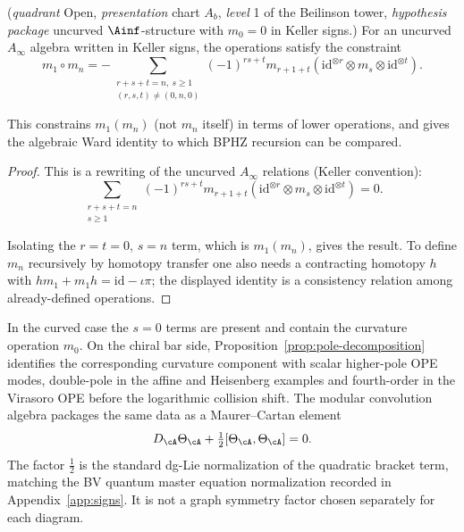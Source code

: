 \begin{theorem}
\label{thm:ainfty-constraint-formula}
\textup{(}\emph{quadrant} Open, \emph{presentation} chart $A_b$,
\emph{level} 1 of the Beilinson tower, \emph{hypothesis package}
uncurved $\Ainf$-structure with $m_0 = 0$ in Keller signs.\textup{)}
For an uncurved $A_\infty$ algebra written in Keller signs, the
operations satisfy the
constraint
\[
m_1 \circ m_n =
-\!\!\sum_{\substack{r+s+t=n,\ s\geq 1\\ (r,s,t) \neq (0,n,0)}}
(-1)^{rs+t}
m_{r+1+t}(\mathrm{id}^{\otimes r}\otimes m_s\otimes
\mathrm{id}^{\otimes t}).
\]

This constrains $m_1(m_n)$ (not $m_n$ itself) in terms of lower operations,
and gives the algebraic Ward identity to which BPHZ recursion can be
compared.
\end{theorem}

\begin{proof}
This is a rewriting of the uncurved $A_\infty$ relations
(Keller convention):
\[
\sum_{\substack{r+s+t=n\\ s\geq 1}} (-1)^{rs+t}
m_{r+1+t}(\mathrm{id}^{\otimes r} \otimes m_s \otimes
\mathrm{id}^{\otimes t}) = 0.
\]

Isolating the $r = t = 0$, $s = n$ term, which is $m_1(m_n)$, gives the result.
To define $m_n$ recursively by homotopy transfer one also needs a
contracting homotopy $h$ with
$h m_1 + m_1 h = \mathrm{id} - \iota\pi$; the displayed identity is a
consistency relation among already-defined operations.
\end{proof}

\begin{remark}
\label{rem:feynman-curvature-qme-half}
In the curved case the $s=0$ terms are present and contain the
curvature operation $m_0$.  On the chiral bar side,
Proposition~\ref{prop:pole-decomposition} identifies the corresponding
curvature component with scalar higher-pole OPE modes, double-pole in
the affine and Heisenberg examples and fourth-order in the Virasoro
OPE before the logarithmic collision shift.  The modular
convolution algebra packages the same data as a Maurer--Cartan element
\[
D_\cA\Theta_\cA+\tfrac{1}{2}[\Theta_\cA,\Theta_\cA]=0.
\]
The factor $\tfrac{1}{2}$ is the standard dg-Lie normalization of the
quadratic bracket term, matching the BV quantum master equation
normalization recorded in Appendix~\ref{app:signs}.  It is not a graph
symmetry factor chosen separately for each diagram.
\end{remark}

